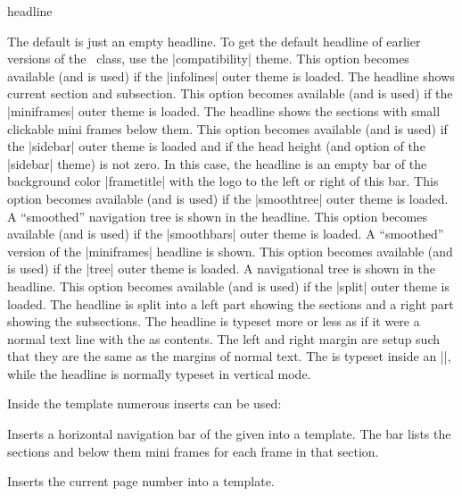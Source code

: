 \begin{element}{headline}
  \begin{templateoptions}
    The default is just an empty headline. To get the default headline of earlier versions of the \beamer\ class, use the |compatibility| theme.
    This option becomes available (and is used) if the |infolines| outer theme is loaded. The headline shows current section and subsection.
    This option becomes available (and is used) if the |miniframes| outer theme is loaded. The headline shows the sections with small clickable mini frames below them.
    This option becomes available (and is used) if the |sidebar| outer theme is loaded and if the head height (and option of the |sidebar| theme) is not zero. In this case, the headline is an empty bar of the background color |frametitle| with the logo to the left or right of this bar.
    This option becomes available (and is used) if the |smoothtree| outer theme is loaded. A ``smoothed'' navigation tree is shown in the headline.
    This option becomes available (and is used) if the |smoothbars| outer theme is loaded. A ``smoothed'' version of the |miniframes| headline is shown.
    This option becomes available (and is used) if the |tree| outer theme is loaded. A navigational tree is shown in the headline.
    This option becomes available (and is used) if the |split| outer theme is loaded. The headline is split into a left part showing the sections and a right part showing the subsections.
    The headline is typeset more or less as if it were a normal text line with the  as contents. The left and right margin are setup such that they are the same as the margins of normal text. The  is typeset inside an |\hbox|, while the headline is normally typeset in vertical mode.
  \end{templateoptions}

  Inside the template numerous inserts can be used:
  \begin{itemize}
    Inserts a horizontal navigation bar of the given  into a template. The bar lists the sections and below them mini frames for each frame in that section.

    \iteminsert{\insertpagenumber}
    Inserts the current page number into a template.


\end{itemize}
\end{element}
